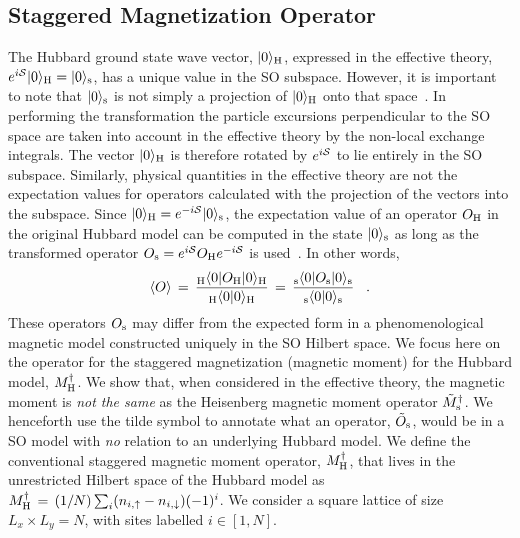 \documentclass[aps,prb,twocolumn,superscriptaddress,
               amsmath]{revtex4}
\renewcommand{\=}{\,=\,}
\newcommand{\+}{\,+\,}
\renewcommand{\-}{\,-\,}
\begin{document}
\subsection{Staggered Magnetization Operator}


The Hubbard ground state wave vector,
$|0\rangle_{\rm H}$, expressed in the effective theory, $e^{i{\cal
S}}|0\rangle_{\rm H}=|0\rangle_{\rm s}$, has a
unique value in the SO subspace.
 However,
it is important to note that $|0\rangle_{\rm s}$ is not simply a
projection of $|0\rangle_{\rm H}$ onto that
space~\cite{Chernyshev}. In performing the transformation the
particle excursions perpendicular to the SO space are taken into account in
the effective theory by the non-local exchange integrals.
The vector $|0\rangle_{\rm H}$ is
therefore rotated by $e^{i{\cal S}}$ to lie entirely in the SO subspace.
Similarly,
physical quantities in the effective theory are not the
expectation values for operators calculated with the projection of
the vectors into the subspace. Since $|0\rangle_{\rm H}=e^{-i{\cal
S}}|0\rangle_{\rm s}$, the expectation value of an operator ${O}_{\rm H}$
in the original Hubbard model can be computed in the
state $|0\rangle_{\rm s}$ as long as the transformed
operator ${O}_{\rm s} = e^{i{\cal S}}  O_{\rm H} e^{-i{\cal S}}$
is used~\cite{Chernyshev,Harris,Sawatzky,Eskes:1994,Paramekanti,Schmidt,Hamer}.
In other words,
\begin{equation}
\left<{O}\right>\,=\,
\frac{_{\rm H}\langle 0|{O}_{\rm H}|0 \rangle_{\rm H}}
{_{\rm H}\langle 0|0 \rangle_{\rm H}}
\,=\,\frac{_{\rm s}\langle 0|{O_{\rm s}}|0\rangle_{\rm s}}
{_{\rm s}\langle 0 |0\rangle_{\rm s}} \;\;\; .
\label{O2}
\end{equation}
These operators ${O}_{\rm s}$ may
differ from the expected form in a phenomenological magnetic model
constructed uniquely in the SO Hilbert space.
We focus here
on the operator for the staggered magnetization (magnetic moment)
 for the Hubbard
model, $M^\dagger_{\rm H}$. We show that, when considered in the
effective theory, the magnetic moment is {\it not the same} as the
Heisenberg magnetic moment operator $\tilde M^\dagger_{\rm s}$. We
henceforth use the tilde symbol  to annotate what an operator,
$\tilde O_{\rm s}$, would be in a SO model with {\it no} relation
to an underlying Hubbard model. We define the conventional
staggered magnetic moment operator, ${M^\dagger _{\rm H}}$, that
lives in the unrestricted Hilbert space of the Hubbard model as
${M^\dagger _{\rm H}} \,=\, (1/N) \sum_i
(n_{i,\uparrow}-n_{i,\downarrow})(-1)^i$. We consider a square
lattice of size $L_x\times L_y=N$, with sites labelled $i \in
[1,N]$.
\end{document}
